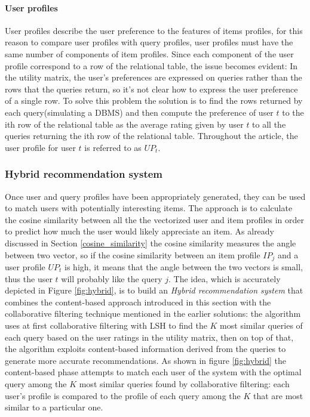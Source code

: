 \paragraph{User profiles} User profiles describe the user preference to the features of items profiles, for this reason to compare user profiles with query profiles, user profiles must have the same number of components of item profiles. Since each component of the user profile correspond to a row of the relational table, the issue becomes evident: In the utility matrix, the user's preferences are expressed on queries rather than the rows that the queries return, so it's not clear how to express the user preference of a single row. To solve this problem the solution is to find the rows returned by each query(simulating a DBMS) and then compute the preference of user $t$ to the ith row of the relational table as the average rating given by user $t$ to all the queries returning the ith row of the relational table. Throughout the article, the user profile for user $t$ is referred to as $UP_t$. 


\subsubsection{Hybrid recommendation system} 
Once user and query profiles have been appropriately generated, they can be used to match users with potentially interesting items. The approach is to calculate the cosine similarity between all the the vectorized user and item profiles in order to predict how much the user would likely appreciate an item. As already discussed in Section \ref{cosine_similarity} the cosine similarity measures the angle between two vector, so if the cosine similarity between an item profile $IP_j$ and a user profile $UP_t$ is high, it means that the angle between the two vectors is small, thus the user $t$ will probably like the query $j$. %
The idea, which is accurately depicted in Figure \ref{fig:hybrid}, is to build an \emph{Hybrid recommendation system} that combines the content-based approach introduced in this section with the collaborative filtering technique mentioned in the earlier solutions: the algorithm uses at first collaborative filtering with LSH to find the $K$ most similar queries of each query based on the user ratings in the utility matrix, then on top of that, the algorithm exploits content-based information derived from the queries to generate more accurate recommendations. As shown in figure \ref{fig:hybrid} the content-based phase attempts to match each user of the system with the optimal query among the $K$ most similar queries found by collaborative filtering: each user's profile is compared to the profile of each query among the $K$ that are most similar to a particular one. 

